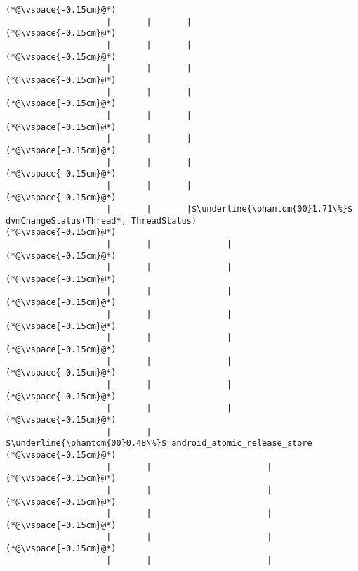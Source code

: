 \begin{lstlisting}[caption=Staattinen metodi C$\to$Java , label=profile:C2JBenchmark00001, numberbychapter=true, frame=lines, float, floatplacement=t]
(*@\vspace{-0.15cm}@*)
                    |       |       |
(*@\vspace{-0.15cm}@*)
                    |       |       |
(*@\vspace{-0.15cm}@*)
                    |       |       |
(*@\vspace{-0.15cm}@*)
                    |       |       |
(*@\vspace{-0.15cm}@*)
                    |       |       |
(*@\vspace{-0.15cm}@*)
                    |       |       |
(*@\vspace{-0.15cm}@*)
                    |       |       |
(*@\vspace{-0.15cm}@*)
                    |       |       |
(*@\vspace{-0.15cm}@*)
                    |       |       |$\underline{\phantom{00}1.71\%}$ dvmChangeStatus(Thread*, ThreadStatus)
(*@\vspace{-0.15cm}@*)
                    |       |               |
(*@\vspace{-0.15cm}@*)
                    |       |               |
(*@\vspace{-0.15cm}@*)
                    |       |               |
(*@\vspace{-0.15cm}@*)
                    |       |               |
(*@\vspace{-0.15cm}@*)
                    |       |               |
(*@\vspace{-0.15cm}@*)
                    |       |               |
(*@\vspace{-0.15cm}@*)
                    |       |               |
(*@\vspace{-0.15cm}@*)
                    |       |               |
(*@\vspace{-0.15cm}@*)
                    |       |                $\underline{\phantom{00}0.48\%}$ android_atomic_release_store
(*@\vspace{-0.15cm}@*)
                    |       |                       |
(*@\vspace{-0.15cm}@*)
                    |       |                       |
(*@\vspace{-0.15cm}@*)
                    |       |                       |
(*@\vspace{-0.15cm}@*)
                    |       |                       |
(*@\vspace{-0.15cm}@*)
                    |       |                       |

\end{lstlisting}
